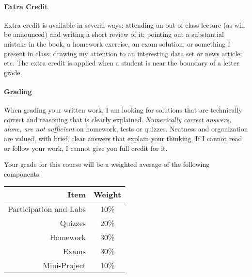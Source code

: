 \documentclass[11pt]{article}
\begin{document}
	\paragraph{Extra Credit}
	Extra credit is available in several ways: attending an out-of-class lecture (as will be announced) and writing a short review of it; pointing out a substantial mistake in the book, a homework exercise, an exam solution, or something I present in class; drawing my attention to an interesting data set or news article; etc. The extra credit is applied when a student is near the boundary of a letter grade.
	
	\paragraph{Grading}
	When grading your written work, I am looking for solutions that are technically correct and reasoning that is clearly explained.  \emph{Numerically correct answers, alone, are not sufficient} on homework, tests or quizzes.  Neatness and organization are valued, with brief, clear answers that explain your thinking.  If I cannot read or follow your work, I cannot give you full credit for it.
	
	Your grade for this course will be a weighted average of the following components:
	
	
	\begin{table}[!h]
		\centering
		\begin{tabular}{r c}
			\toprule
			Item & Weight \\
			\midrule
			Participation and Labs & 10\% \\
			\cmidrule(r){1-2}
            Quizzes & 20\% \\
			\cmidrule(r){1-2}
			Homework & 30\% \\
			\cmidrule(r){1-2}
			Exams & 30\% \\
			\cmidrule(r){1-2}
			Mini-Project & 10\% \\
			\bottomrule
		\end{tabular}
	\end{table}
	
\end{document}
